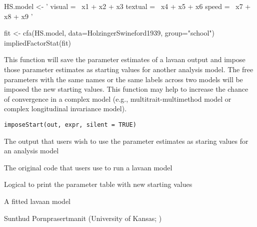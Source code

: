 \documentclass[a4paper]{book}
\begin{document}
%
\begin{Examples}
\begin{ExampleCode}
HS.model <- ' visual  =~ x1 + x2 + x3
              textual =~ x4 + x5 + x6
              speed   =~ x7 + x8 + x9 '

fit <- cfa(HS.model, data=HolzingerSwineford1939, group="school")
impliedFactorStat(fit)
\end{ExampleCode}
\end{Examples}
%
\begin{Description}\relax
This function will save the parameter estimates of a lavaan output and impose those parameter estimates as starting values for another analysis model. The free parameters with the same names or the same labels across two models will be imposed the new starting values. This function may help to increase the chance of convergence in a complex model (e.g., multitrait-multimethod model or complex longitudinal invariance model).
\end{Description}
%
\begin{Usage}
\begin{verbatim}
imposeStart(out, expr, silent = TRUE)
\end{verbatim}
\end{Usage}
%
\begin{Arguments}
\begin{ldescription}
\item[\code{out}] 
The  output that users wish to use the parameter estimates as staring values for an analysis model

\item[\code{expr}] 
The original code that users use to run a lavaan model

\item[\code{silent}] 
Logical to print the parameter table with new starting values

\end{ldescription}
\end{Arguments}
%
\begin{Value}
A fitted lavaan model
\end{Value}
%
\begin{Author}\relax
Sunthud Pornprasertmanit (University of Kansas; )
\end{Author}
%
\end{document}
